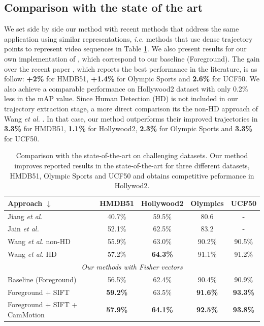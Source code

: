 \documentclass[runningheads]{llncs}
\begin{document}
\subsection{Comparison with the state of the art}
We set side by side our method with recent methods that address the same application using similar representations, \emph{i.e.} methods that use dense trajectory points to represent video sequences \cite{wang2013, jiang2012, jain2013} in Table \ref{tab:stateofart}. We also present results for our own implementation of \cite{wang2013}, which correspond to our baseline (Foreground). The gain over the recent paper \cite{wang2013}, which reports the best performance in the literature, is as follow: \textbf{+2\%} for HMDB51, \textbf{+1.4\%} for Olympic Sports and \textbf{2.6\%} for UCF50. We also achieve a comparable performance on Hollywood2 dataset with only 0.2\% less in the mAP value. Since Human Detection (HD) is not included in our trajectory extraction stage, a more direct comparison its the non-HD approach of Wang \emph{et al.} \cite{wang2013}. In that case, our method outperforms their improved trajectories in \textbf{3.3\%} for HMDB51, \textbf{1.1\%} for Hollywood2, \textbf{2.3\%} for Olympic Sports and \textbf{3.3\%} for UCF50.

\begin{table}[ht!]
\caption{Comparison with the state-of-the-art on challenging datasets. Our method improves reported results in the state-of-the-art for three different datasets, HMDB51, Olympic Sports and UCF50 and obtains competitive peformance in Hollywod2.}
\begin{center}
{
\begin{tabular}{ |l| c c c c| }
\hline
Approach $\downarrow$ & HMDB51 & Hollywood2 & Olympics & UCF50 \\
\hline
Jiang \emph{et al.} \cite{jiang2012} & 40.7\% & 59.5\% & 80.6 & - \\
Jain \emph{et al.} \cite{jain2013} & 52.1\% & 62.5\% & 83.2 & - \\
Wang \emph{et al.} \cite{wang2013} non-HD & 55.9\% & 63.0\% & 90.2\% & 90.5\% \\
Wang \emph{et al.} \cite{wang2013} HD & 57.2\% & \textbf{64.3\%} & 91.1\% & 91.2\% \\
\hline
\multicolumn{5}{|c|}{\textit{Our methods with Fisher vectors}} \\
\hline
Baseline (Foreground) & 56.5\% & 62.4\% & 90.4\% & 90.9\% \\
Foreground + SIFT & \textbf{59.2\%} & 63.5\% & \textbf{91.6\%} & \textbf{93.3\%} \\
Foreground + SIFT + CamMotion  & \textbf{57.9\%} & \textbf{64.1\%} & \textbf{92.5\%} & \textbf{93.8\%} \\
\hline
\end{tabular}
}
\end{center}
\label{tab:stateofart}
\end{table}
\end{document}
